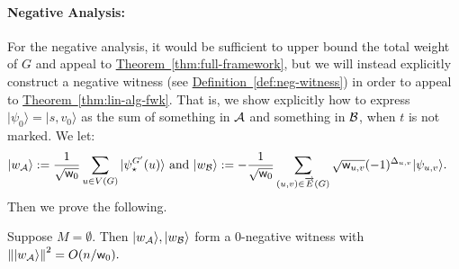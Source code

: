 \documentclass{theoretics}
\newcommand{\thm}[1]{\hyperref[thm:#1]{Theorem~\ref*{thm:#1}}}
\newcommand{\defin}[1]{\hyperref[def:#1]{Definition~\ref*{def:#1}}}
\def\ket#1{{\lvert}#1\rangle}
\renewcommand{\>}{\rangle}
\newcommand{\<}{\langle}
\renewcommand{\(}{\left(}
\renewcommand{\)}{\right)}
\def\norm#1{\left\| #1 \right\|}
\def\w{{\sf w}}
\begin{document}
\paragraph{Negative Analysis:} For the negative analysis, it would be sufficient to upper bound the total weight of $G$ and appeal to \thm{full-framework}, but we will instead explicitly construct a negative witness (see \defin{neg-witness}) in order to appeal to \thm{lin-alg-fwk}. 
That is, we show explicitly how to express $\ket{\psi_0}=\ket{s,v_0}$ as the sum of something in ${\cal A}$ and something in ${\cal B}$, when $t$ is not marked. We let:
\begin{equation}
\begin{split}
\ket{w_{\cal A}} &:= \frac{1}{\sqrt{\w_0}}\sum_{u\in V(G)}\ket{\psi_\star^{G'}(u)}
\mbox{ and }\ket{w_{\cal B}} := -\frac{1}{\sqrt{\w_0}}\sum_{(u,v)\in \overrightarrow{E}(G)}\sqrt{\w_{u,v}}(-1)^{\Delta_{u,v}}\ket{\psi_{u,v}}.
\end{split}\label{eq:welded-neg-witness}
\end{equation}
Then we prove the following.
\begin{lemma}\label{lem:welded-neg-analysis}
Suppose $M=\emptyset$. Then $\ket{w_{\cal A}},\ket{w_{\cal B}}$ form a 0-negative witness with 
$
\norm{\ket{w_{\cal A}}}^2=O(n/\w_0).
$
\end{lemma}
\end{document}
